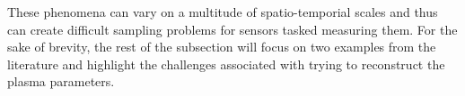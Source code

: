 %
%
%
%

These phenomena can vary on a multitude of spatio-temporial scales and thus can create difficult sampling problems for sensors tasked measuring them. For the sake of brevity, the rest of the subsection will focus on two examples from the literature and highlight the challenges associated with trying to reconstruct the plasma parameters.

